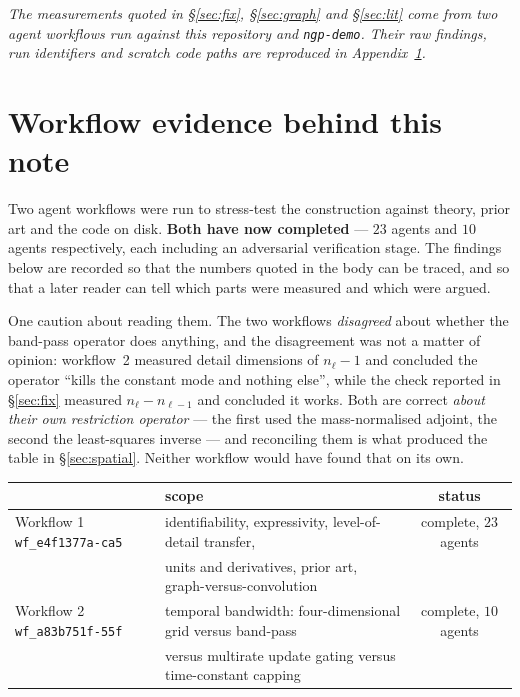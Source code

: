 \documentclass[11pt,a4paper]{article}
\begin{document}
\bigskip
\noindent
\emph{The measurements quoted in \S\ref{sec:fix}, \S\ref{sec:graph} and \S\ref{sec:lit} come from two
agent workflows run against this repository and \texttt{ngp-demo}. Their raw findings, run
identifiers and scratch code paths are reproduced in Appendix~\ref{app:workflow}.}

\appendix

\section{Workflow evidence behind this note}
\label{app:workflow}

Two agent workflows were run to stress-test the construction against theory, prior art and
the code on disk. \textbf{Both have now completed} --- $23$ agents and $10$ agents
respectively, each including an adversarial verification stage. The findings below are
recorded so that the numbers quoted in the body can be traced, and so that a later reader can
tell which parts were measured and which were argued.

One caution about reading them. The two workflows \emph{disagreed} about whether the
band-pass operator does anything, and the disagreement was not a matter of opinion: workflow~2
measured detail dimensions of $n_\ell - 1$ and concluded the operator ``kills the constant
mode and nothing else'', while the check reported in \S\ref{sec:fix} measured
$n_\ell - n_{\ell-1}$ and concluded it works. Both are correct \emph{about their own
restriction operator} --- the first used the mass-normalised adjoint, the second the
least-squares inverse --- and reconciling them is what produced the table in
\S\ref{sec:spatial}. Neither workflow would have found that on its own.

\begin{center}
\begin{tabular}{@{}llc@{}}
\toprule
& \textbf{scope} & \textbf{status} \\
\midrule
Workflow 1 \quad \texttt{wf\_e4f1377a-ca5}
  & identifiability, expressivity, level-of-detail transfer, & complete, $23$ agents \\
  & units and derivatives, prior art, graph-versus-convolution & \\[2pt]
Workflow 2 \quad \texttt{wf\_a83b751f-55f}
  & temporal bandwidth: four-dimensional grid versus band-pass & complete, $10$ agents \\
  & versus multirate update gating versus time-constant capping & \\
\bottomrule
\end{tabular}
\end{center}
\end{document}

